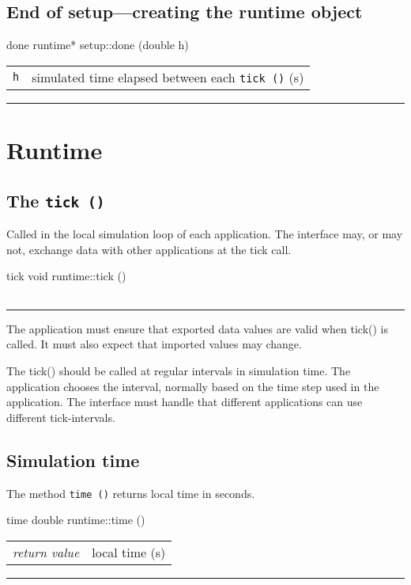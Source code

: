 \documentclass[a4paper]{report}
\makeatletter
\newenvironment{parameters}%
{\begin{tabular}{@{\hspace{2em}}lp{0.6\textwidth}}}%
{\end{tabular}\par\vspace{1mm}\par\hrule\par\vspace{5mm}}
\makeatother
\begin{document}
\subsection{End of setup---creating the runtime object}

\begin{head}{done}
  runtime* setup::done (double h)
\end{head}
\begin{parameters}
  \lstinline|h| & simulated time elapsed between each \lstinline|tick ()| (s) \\
\end{parameters}

\section{Runtime}

\subsection{The \lstinline|tick ()|}

Called in the local simulation loop of each application.  The
interface may, or may not, exchange data with other applications at
the tick call.

\begin{head}{tick}
  void runtime::tick ()
\end{head}
\begin{parameters}
\end{parameters}

The application must ensure that exported data values are valid when
tick() is called.  It must also expect that imported values may change.

The tick() should be called at regular intervals in simulation time.
The application chooses the interval, normally based on the time step
used in the application.  The interface must handle that different
applications can use different tick-intervals.

\subsection{Simulation time}

The method \lstinline|time ()| returns local time in seconds.

\begin{head}{time}
  double runtime::time ()
\end{head}
\begin{parameters}
  \emph{return value} & local time (s) \\
\end{parameters}
\end{document}
